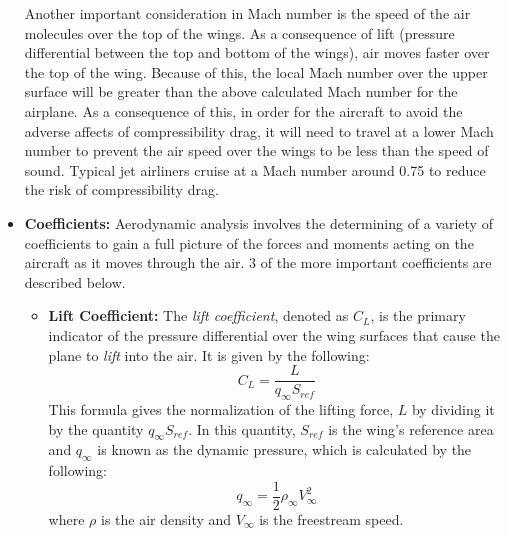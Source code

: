 \documentclass{article}
\begin{document}
\begin{itemize}
    Another important consideration in Mach number is the speed of the air molecules over the top of the wings. As a consequence of lift (pressure differential between the top and bottom of the wings), air moves faster over the top of the wing. Because of this, the local Mach number over the upper surface will be greater than the above calculated Mach number for the airplane.
    As a consequence of this, in order for the aircraft to avoid the adverse affects of compressibility drag, it will need to travel at a lower Mach number to prevent the air speed over the wings to be less than the speed of sound. Typical jet airliners cruise at a Mach number around 0.75 to reduce the risk of compressibility drag.
    \item[] \textbf{Coefficients:} Aerodynamic analysis involves the determining of a variety of coefficients to gain a full picture of the forces and moments acting on the aircraft as it moves through the air. 3 of the more important coefficients are described below.
    \begin{itemize}
        \item[] \textbf{Lift Coefficient:} The \textit{lift coefficient}, denoted as $C_L$, is the primary indicator of the pressure differential over the wing surfaces that cause the plane to \textit{lift} into the air.
        It is given by the following:
        \begin{equation}
            C_L = \frac{L}{q_{\infty} S_{ref}}\label{lift_coefficient}
        \end{equation}
        This formula gives the normalization of the lifting force, $L$ by dividing it by the quantity $q_{\infty} S_{ref}$. In this quantity, $S_{ref}$ is the wing's reference area and $q_{\infty}$ is known as the dynamic pressure, which is calculated by the following:
        \begin{equation}
        q_{\infty} = \frac{1}{2} \rho_{\infty} V_{\infty}^2\label{dynamic_pressure}
        \end{equation}
        where $\rho$ is the air density and $V_{\infty}$ is the freestream speed.


\end{itemize}
\end{itemize}
\end{document}
